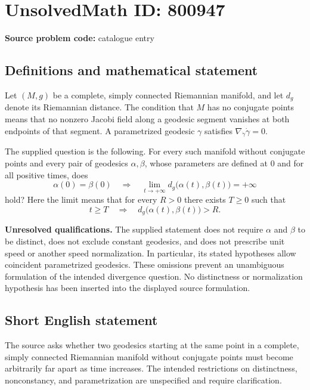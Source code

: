 \documentclass[11pt]{article}
\begin{document}
\section*{UnsolvedMath ID: 800947}
\textbf{Source problem code:} catalogue entry
\subsection{Definitions and mathematical statement}
Let \((M,g)\) be a complete, simply connected Riemannian manifold, and let \(d_g\) denote its Riemannian distance. The condition that \(M\) has no conjugate points means that no nonzero Jacobi field along a geodesic segment vanishes at both endpoints of that segment. A parametrized geodesic \(\gamma\) satisfies \(\nabla_{\dot\gamma}\dot\gamma=0\).

The supplied question is the following. For every such manifold without conjugate points and every pair of geodesics \(\alpha,\beta\), whose parameters are defined at \(0\) and for all positive times, does
\[
\alpha(0)=\beta(0)
\quad\Longrightarrow\quad
\lim_{t\to+\infty}d_g\bigl(\alpha(t),\beta(t)\bigr)=+\infty
\]
hold? Here the limit means that for every \(R>0\) there exists \(T\geq0\) such that
\[
 t\geq T\quad\Longrightarrow\quad d_g\bigl(\alpha(t),\beta(t)\bigr)>R.
\]

\textbf{Unresolved qualifications.} The supplied statement does not require \(\alpha\) and \(\beta\) to be distinct, does not exclude constant geodesics, and does not prescribe unit speed or another speed normalization. In particular, its stated hypotheses allow coincident parametrized geodesics. These omissions prevent an unambiguous formulation of the intended divergence question. No distinctness or normalization hypothesis has been inserted into the displayed source formulation.
\subsection{Short English statement}
The source asks whether two geodesics starting at the same point in a complete, simply connected Riemannian manifold without conjugate points must become arbitrarily far apart as time increases. The intended restrictions on distinctness, nonconstancy, and parametrization are unspecified and require clarification.
\end{document}
